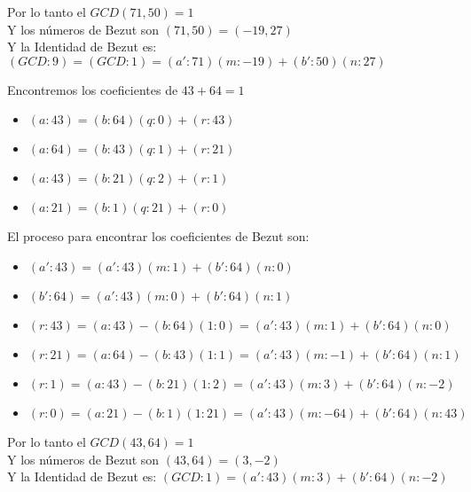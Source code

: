 \documentclass[12pt, fleqn]{article}                             %
\begin{document}
            Por lo tanto el $GCD(71, 50) = 1$\\
            Y los números de Bezut son $(71, 50) = (-19, 27)$\\                       
            Y la Identidad de Bezut es: $(GCD:9) = (GCD:1) = (a':71)(m:-19) +(b':50)(n:27)$\\



            \clearpage



            Encontremos los coeficientes de $43 + 64 = 1$
            \begin{itemize}
                \item $(a:43) = (b:64)(q:0) + (r:43)$ 
                \item $(a:64) = (b:43)(q:1) + (r:21)$ 
                \item $(a:43) = (b:21)(q:2) + (r:1) $ 
                \item $(a:21) = (b:1)(q:21) + (r:0) $ 
            \end{itemize}

            El proceso para encontrar los coeficientes de Bezut son:

            \begin{itemize}
                \item $(a':43) = (a':43)(m:1) + (b':64)(n:0)$
                \item $(b':64) = (a':43)(m:0) + (b':64)(n:1)$   
            \end{itemize}

            \begin{itemize}
                \item $(r:43) = (a:43) - (b:64)(1:0)  =  (a':43)(m:1) + (b':64)(n:0)  $ 
                \item $(r:21) = (a:64) - (b:43)(1:1)  =  (a':43)(m:-1) + (b':64)(n:1) $ 
                \item $(r:1) = (a:43) - (b:21)(1:2)  =  (a':43)(m:3) + (b':64)(n:-2)  $ 
                \item $(r:0) = (a:21) - (b:1)(1:21)  =  (a':43)(m:-64) + (b':64)(n:43)$  
            \end{itemize}

            Por lo tanto el $GCD(43, 64) = 1$\\
            Y los números de Bezut son $(43, 64) = (3, -2)$\\                       
            Y la Identidad de Bezut es: $(GCD:1) = (a':43)(m:3) +(b':64)(n:-2)$\\
\end{document}
